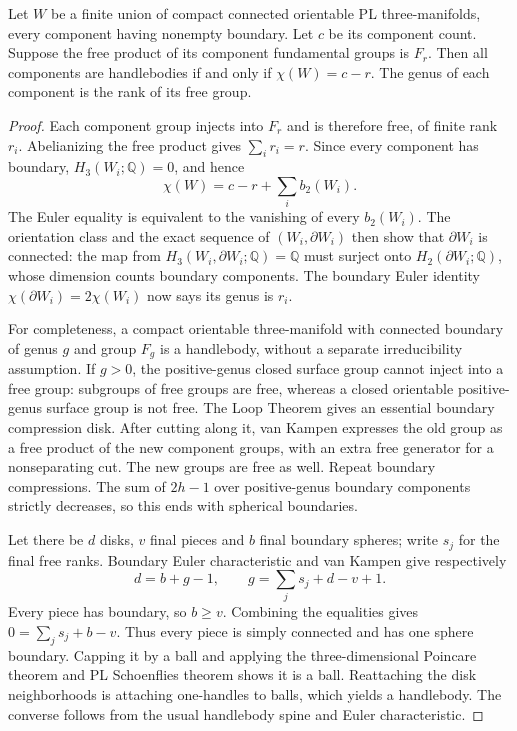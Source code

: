 \begin{proposition}
\label{euler-group:criterion}
Let $W$ be a finite union of compact connected orientable PL
three-manifolds, every component having nonempty boundary.  Let $c$ be its
component count.  Suppose the free product of its component fundamental
groups is $F_r$.  Then all components are handlebodies if and only if
$\chi(W)=c-r$.  The genus of each component is the rank of its free group.
\end{proposition}
\begin{proof}
Each component group injects into $F_r$ and is therefore free, of finite
rank $r_i$.  Abelianizing the free product gives $\sum_i r_i=r$.
Since every component has boundary, $H_3(W_i;\mathbb Q)=0$, and hence
\[
 \chi(W)=c-r+\sum_i b_2(W_i).
\]
The Euler equality is equivalent to the vanishing of every $b_2(W_i)$.
The orientation class and the exact sequence of $(W_i,\partial W_i)$ then
show that $\partial W_i$ is connected: the map from
$H_3(W_i,\partial W_i;\mathbb Q)=\mathbb Q$ must surject onto
$H_2(\partial W_i;\mathbb Q)$, whose dimension counts boundary components.
The boundary Euler identity $\chi(\partial W_i)=2\chi(W_i)$ now says its
genus is $r_i$.

For completeness, a compact orientable three-manifold with connected
boundary of genus $g$ and group $F_g$ is a handlebody, without a separate
irreducibility assumption.  If $g>0$, the positive-genus closed surface
group cannot inject into a free group: subgroups of free groups are free,
whereas a closed orientable positive-genus surface group is not free.
The Loop Theorem gives an essential boundary compression disk.  After
cutting along it, van Kampen expresses the old group as a free product of
the new component groups, with an extra free generator for a
nonseparating cut.  The new groups are free as well.  Repeat boundary
compressions.  The sum of $2h-1$ over positive-genus boundary components
strictly decreases, so this ends with spherical boundaries.

Let there be $d$ disks, $v$ final pieces and $b$ final boundary spheres;
write $s_j$ for the final free ranks.  Boundary Euler characteristic and
van Kampen give respectively
\[
 d=b+g-1,\qquad g=\sum_j s_j+d-v+1.
\]
Every piece has boundary, so $b\geq v$.  Combining the equalities gives
$0=\sum_j s_j+b-v$.  Thus every piece is simply connected and has one
sphere boundary.  Capping it by a ball and applying the
three-dimensional Poincare theorem and PL Schoenflies theorem shows it
is a ball.  Reattaching the disk neighborhoods is attaching one-handles
to balls, which yields a handlebody.  The converse follows from the usual
handlebody spine and Euler characteristic.
\end{proof}

